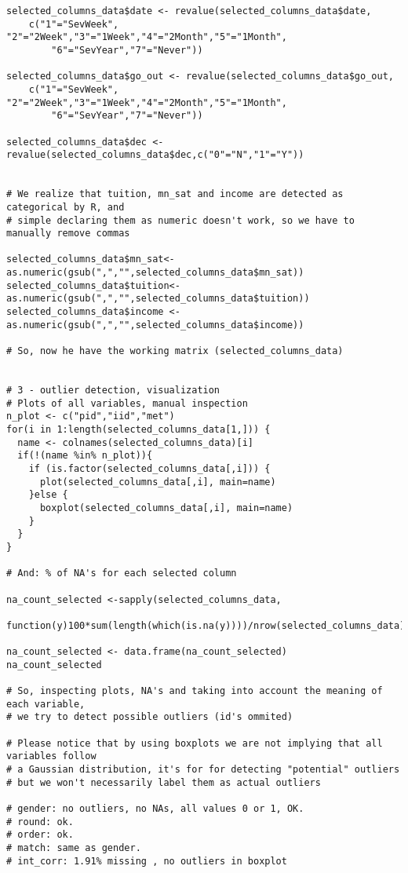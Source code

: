 \begin{verbatim}
selected_columns_data$date <- revalue(selected_columns_data$date,
    c("1"="SevWeek", "2"="2Week","3"="1Week","4"="2Month","5"="1Month",
        "6"="SevYear","7"="Never"))
    
selected_columns_data$go_out <- revalue(selected_columns_data$go_out,
    c("1"="SevWeek", "2"="2Week","3"="1Week","4"="2Month","5"="1Month",
        "6"="SevYear","7"="Never"))
    
selected_columns_data$dec <- revalue(selected_columns_data$dec,c("0"="N","1"="Y"))


# We realize that tuition, mn_sat and income are detected as categorical by R, and
# simple declaring them as numeric doesn't work, so we have to manually remove commas

selected_columns_data$mn_sat<-as.numeric(gsub(",","",selected_columns_data$mn_sat))
selected_columns_data$tuition<-as.numeric(gsub(",","",selected_columns_data$tuition))
selected_columns_data$income <- as.numeric(gsub(",","",selected_columns_data$income))

# So, now he have the working matrix (selected_columns_data)


# 3 - outlier detection, visualization
# Plots of all variables, manual inspection
n_plot <- c("pid","iid","met")
for(i in 1:length(selected_columns_data[1,])) {
  name <- colnames(selected_columns_data)[i]
  if(!(name %in% n_plot)){
    if (is.factor(selected_columns_data[,i])) {
      plot(selected_columns_data[,i], main=name)
    }else {
      boxplot(selected_columns_data[,i], main=name)
    }
  }
}

# And: % of NA's for each selected column

na_count_selected <-sapply(selected_columns_data,
    function(y)100*sum(length(which(is.na(y))))/nrow(selected_columns_data))
    
na_count_selected <- data.frame(na_count_selected)
na_count_selected

# So, inspecting plots, NA's and taking into account the meaning of each variable,
# we try to detect possible outliers (id's ommited)

# Please notice that by using boxplots we are not implying that all variables follow
# a Gaussian distribution, it's for for detecting "potential" outliers 
# but we won't necessarily label them as actual outliers

# gender: no outliers, no NAs, all values 0 or 1, OK.
# round: ok.
# order: ok.
# match: same as gender.
# int_corr: 1.91% missing , no outliers in boxplot


\end{verbatim}
